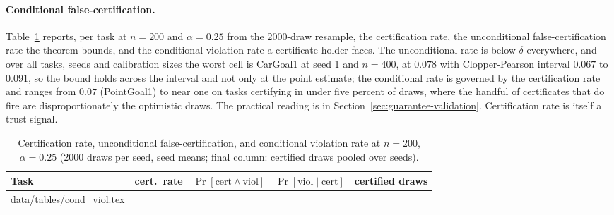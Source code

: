 \documentclass{article} %
\makeatletter
\newcommand{\tabinput}[1]{\@@input#1 }
\makeatother
\begin{document}
\paragraph{Conditional false-certification.} Table~\ref{tab:condviol} reports, per task at $n = 200$ and $\alpha = 0.25$ from the 2000-draw resample, the certification rate, the unconditional false-certification rate the theorem bounds, and the conditional violation rate a certificate-holder faces. The unconditional rate is below $\delta$ everywhere, and over all tasks, seeds and calibration sizes the worst cell is CarGoal1 at seed 1 and $n = 400$, at $0.078$ with Clopper-Pearson interval $0.067$ to $0.091$, so the bound holds across the interval and not only at the point estimate; the conditional rate is governed by the certification rate and ranges from $0.07$ (PointGoal1) to near one on tasks certifying in under five percent of draws, where the handful of certificates that do fire are disproportionately the optimistic draws. The practical reading is in Section~\ref{sec:guarantee-validation}. Certification rate is itself a trust signal.

\begin{table}[h]
\caption{Certification rate, unconditional false-certification, and conditional violation rate at $n = 200$, $\alpha = 0.25$ (2000 draws per seed, seed means; final column: certified draws pooled over seeds).}
\label{tab:condviol}
\begin{center}
\small
\begin{tabular}{l rrrr}
\toprule
Task & cert.\ rate & $\Pr[\text{cert} \wedge \text{viol}]$ & $\Pr[\text{viol} \mid \text{cert}]$ & certified draws \\
\midrule
\tabinput{data/tables/cond_viol.tex}
\bottomrule
\end{tabular}
\end{center}
\end{table}
\end{document}
